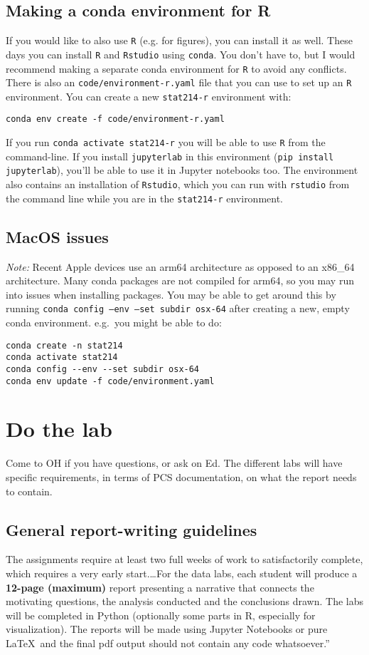 \documentclass[letterpaper,12pt]{article}
\begin{document}
\subsection{Making a conda environment for R}
If you would like to also use \texttt{R} (e.g. for figures), you can install it as well. These days you can install \texttt{R} and \texttt{Rstudio} using \texttt{conda}. You don't have to, but I would recommend making a separate conda environment for \texttt{R} to avoid any conflicts. There is also an \texttt{code/environment-r.yaml} file that you can use to set up an \texttt{R} environment. You can create a new \texttt{stat214-r} environment with:
\begin{verbatim}
conda env create -f code/environment-r.yaml
\end{verbatim}
If you run \texttt{conda activate stat214-r} you will be able to use \texttt{R} from the command-line. If you install \texttt{jupyterlab} in this environment (\texttt{pip install jupyterlab}), you'll be able to use it in Jupyter notebooks too. The environment also contains an installation of \texttt{Rstudio}, which you can run with \texttt{rstudio} from the command line while you are in the \texttt{stat214-r} environment.

\subsection{MacOS issues}
\textit{Note:} Recent Apple devices use an arm64 architecture as opposed to an x86\_64 architecture. Many conda packages are not compiled for arm64, so you may run into issues when installing packages. You may be able to get around this by running \texttt{conda config --env --set subdir osx-64} after creating a new, empty conda environment. e.g.~you might be able to do:
\begin{verbatim}
conda create -n stat214
conda activate stat214
conda config --env --set subdir osx-64
conda env update -f code/environment.yaml
\end{verbatim}

\section{Do the lab}
Come to OH if you have questions, or ask on Ed. The different labs will have specific requirements, in terms of PCS documentation, on what the report needs to contain.

\subsection{General report-writing guidelines}
The assignments require at least two full weeks of work to satisfactorily complete, which requires a very early start.\ldots For the data labs, each student will produce a \textbf{12-page (maximum)} report presenting a narrative that connects the motivating
questions, the analysis conducted and the conclusions drawn. The labs will be completed in Python
(optionally some parts in R, especially for visualization). The reports will be made using Jupyter
Notebooks or pure \LaTeX\ and the final pdf output should not contain any code whatsoever.''
\end{document}
